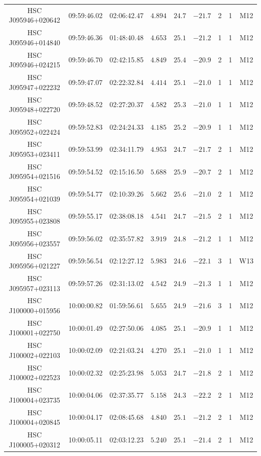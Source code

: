 \documentclass[]{pasj01}
\begin{document}
{\begin{longtable}{ccccccccc}
HSC J095946+020642 & 09:59:46.02 & 02:06:42.47 & $4.894$ & $24.7$ & $-21.7$ & 2 & 1 & M12 \\
HSC J095946+014840 & 09:59:46.36 & 01:48:40.48 & $4.653$ & $25.1$ & $-21.2$ & 1 & 1 & M12 \\
HSC J095946+024215 & 09:59:46.70 & 02:42:15.85 & $4.849$ & $25.4$ & $-20.9$ & 2 & 1 & M12 \\
HSC J095947+022232 & 09:59:47.07 & 02:22:32.84 & $4.414$ & $25.1$ & $-21.0$ & 1 & 1 & M12 \\
HSC J095948+022720 & 09:59:48.52 & 02:27:20.37 & $4.582$ & $25.3$ & $-21.0$ & 1 & 1 & M12 \\
HSC J095952+022424 & 09:59:52.83 & 02:24:24.33 & $4.185$ & $25.2$ & $-20.9$ & 1 & 1 & M12 \\
HSC J095953+023411 & 09:59:53.99 & 02:34:11.79 & $4.953$ & $24.7$ & $-21.7$ & 2 & 1 & M12 \\
HSC J095954+021516 & 09:59:54.52 & 02:15:16.50 & $5.688$ & $25.9$ & $-20.7$ & 2 & 1 & M12 \\
HSC J095954+021039 & 09:59:54.77 & 02:10:39.26 & $5.662$ & $25.6$ & $-21.0$ & 2 & 1 & M12 \\
HSC J095955+023808 & 09:59:55.17 & 02:38:08.18 & $4.541$ & $24.7$ & $-21.5$ & 2 & 1 & M12 \\
HSC J095956+023557 & 09:59:56.02 & 02:35:57.82 & $3.919$ & $24.8$ & $-21.2$ & 1 & 1 & M12 \\
HSC J095956+021227 & 09:59:56.54 & 02:12:27.12 & $5.983$ & $24.6$ & $-22.1$ & 3 & 1 & W13 \\
HSC J095957+023113 & 09:59:57.26 & 02:31:13.02 & $4.542$ & $24.9$ & $-21.3$ & 1 & 1 & M12 \\
HSC J100000+015956 & 10:00:00.82 & 01:59:56.61 & $5.655$ & $24.9$ & $-21.6$ & 3 & 1 & M12 \\
HSC J100001+022750 & 10:00:01.49 & 02:27:50.06 & $4.085$ & $25.1$ & $-20.9$ & 1 & 1 & M12 \\
HSC J100002+022103 & 10:00:02.09 & 02:21:03.24 & $4.270$ & $25.1$ & $-21.0$ & 1 & 1 & M12 \\
HSC J100002+022523 & 10:00:02.32 & 02:25:23.98 & $5.053$ & $24.7$ & $-21.8$ & 2 & 1 & M12 \\
HSC J100004+023735 & 10:00:04.06 & 02:37:35.77 & $5.158$ & $24.3$ & $-22.2$ & 2 & 1 & M12 \\
HSC J100004+020845 & 10:00:04.17 & 02:08:45.68 & $4.840$ & $25.1$ & $-21.2$ & 2 & 1 & M12 \\
HSC J100005+020312 & 10:00:05.11 & 02:03:12.23 & $5.240$ & $25.1$ & $-21.4$ & 2 & 1 & M12 \\

\end{longtable}}
\end{document}
